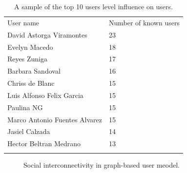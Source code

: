 \begin{table}
\small
\caption{A sample of the top 10 users level influence on users.}
\label{tab:knownUsers_3}
\centering
\small
\begin{tabular}{p{3cm} p{3cm}  }
\hline\noalign{\smallskip}
 User name & Number of known users \\
\noalign{\smallskip}\hline\noalign{\smallskip}
\small{David Astorga Viramontes} & \small{23}  \\ \hline
\small{Evelyn Macedo} & \small{18}  \\ \hline
\small{Reyes Zuniga} & \small{17}  \\ \hline
\small{Barbara Sandoval} & \small{16}  \\ \hline
\small{Chriss de Blanc} & \small{15}  \\ \hline
\small{Luis Alfonso Felix Garcia} & \small{15}  \\ \hline
\small{Paulina NG} & \small{15}  \\ \hline
\small{Marco Antonio Fuentes Alvarez} & \small{15}  \\ \hline
\small{Jasiel Calzada} & \small{14}  \\ \hline
\small{Hector Beltran Medrano} & \small{13}  \\ \hline
\noalign{\smallskip}\hline
\end{tabular}
\end{table}


\begin{figure}
\centering
{} %
\caption{Social interconnectivity in graph-based user meodel.}
\label{fig:graphKnown_3}
\end{figure}

